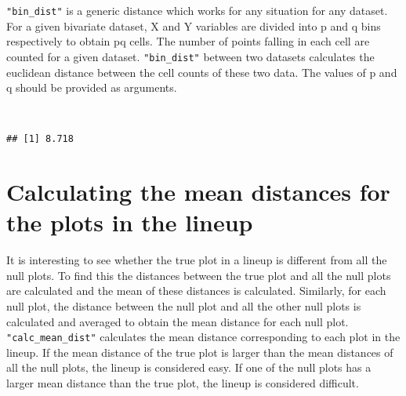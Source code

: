 \texttt{"bin\_dist"} is a generic distance which works for any situation
for any dataset. For a given bivariate dataset, X and Y variables are
divided into p and q bins respectively to obtain pq cells. The number of
points falling in each cell are counted for a given dataset.
\texttt{"bin\_dist"} between two datasets calculates the euclidean
distance between the cell counts of these two data. The values of p and
q should be provided as arguments.

\begin{Shaded}
\begin{Highlighting}[]
\NormalTok{(} \\
\NormalTok{(} \NormalTok{, } \NormalTok{, } \NormalTok{))}
\end{Highlighting}
\end{Shaded}

\begin{verbatim}
## [1] 8.718
\end{verbatim}

\section{Calculating the mean distances for the plots in the
lineup}\label{calculating-the-mean-distances-for-the-plots-in-the-lineup}

It is interesting to see whether the true plot in a lineup is different
from all the null plots. To find this the distances between the true
plot and all the null plots are calculated and the mean of these
distances is calculated. Similarly, for each null plot, the distance
between the null plot and all the other null plots is calculated and
averaged to obtain the mean distance for each null plot.
\texttt{"calc\_mean\_dist"} calculates the mean distance corresponding
to each plot in the lineup. If the mean distance of the true plot is
larger than the mean distances of all the null plots, the lineup is
considered easy. If one of the null plots has a larger mean distance
than the true plot, the lineup is considered difficult.

\begin{Shaded}
\begin{Highlighting}[]
\NormalTok{(}\NormalTok{(}\NormalTok{(} \NormalTok{), }\\
 \NormalTok{(}\NormalTok{, }\NormalTok{), } \NormalTok{, } \NormalTok{)}
\end{Highlighting}
\end{Shaded}

